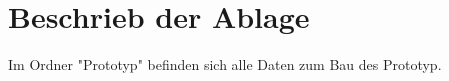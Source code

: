 \section{Beschrieb der Ablage}

Im Ordner "Prototyp" befinden sich alle Daten zum Bau des Prototyp. 
